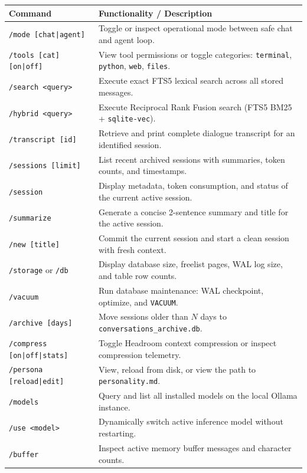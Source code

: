 \begin{table}[htbp]
\centering
\small
\begin{tabular}{lp{9.5cm}}
\toprule
\textbf{Command} & \textbf{Functionality / Description} \\
\midrule
\texttt{/mode [chat|agent]} & Toggle or inspect operational mode between safe chat and agent loop. \\
\texttt{/tools [cat] [on|off]} & View tool permissions or toggle categories: \texttt{terminal}, \texttt{python}, \texttt{web}, \texttt{files}. \\
\texttt{/search <query>} & Execute exact FTS5 lexical search across all stored messages. \\
\texttt{/hybrid <query>} & Execute Reciprocal Rank Fusion search (FTS5 BM25 + \texttt{sqlite-vec}). \\
\texttt{/transcript [id]} & Retrieve and print complete dialogue transcript for an identified session. \\
\texttt{/sessions [limit]} & List recent archived sessions with summaries, token counts, and timestamps. \\
\texttt{/session} & Display metadata, token consumption, and status of the current active session. \\
\texttt{/summarize} & Generate a concise 2-sentence summary and title for the active session. \\
\texttt{/new [title]} & Commit the current session and start a clean session with fresh context. \\
\texttt{/storage} or \texttt{/db} & Display database size, freelist pages, WAL log size, and table row counts. \\
\texttt{/vacuum} & Run database maintenance: WAL checkpoint, optimize, and \texttt{VACUUM}. \\
\texttt{/archive [days]} & Move sessions older than $N$ days to \texttt{conversations\_archive.db}. \\
\texttt{/compress [on|off|stats]} & Toggle Headroom context compression or inspect compression telemetry. \\
\texttt{/persona [reload|edit]} & View, reload from disk, or view the path to \texttt{personality.md}. \\
\texttt{/models} & Query and list all installed models on the local Ollama instance. \\
\texttt{/use <model>} & Dynamically switch active inference model without restarting. \\
\texttt{/buffer} & Inspect active memory buffer messages and character counts. \\

\end{tabular}
\end{table}
